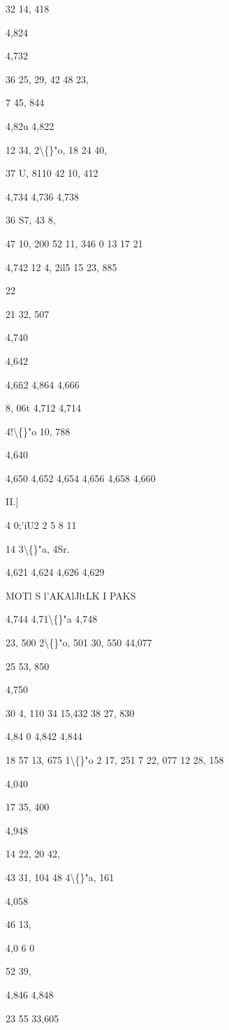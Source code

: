\documentclass[10pt,a4paper]{article}
\begin{document}
32 14, 418

4,824

4,732

36 25,
29,
42
48 23,

7 45, 844

4,82u
4,822

12 34,
2\textbackslash\{\}"o,
18
24 40,

37 U, 8110
42 10, 412

4,734
4,736
4,738

36 S7,
43 8,

47 10, 200
52 11, 346
0
13
17
21

4,742
12 4, 2il5
15 23, 885

22

21 32, 507

4,740

4,642

4,6fi2
4,864
4,666

8, 06t
4,712
4,714

4!\textbackslash\{\}"o 10, 788

4,640

4,650
4,652
4,654
4,656
4,658
4,660

II.]

4 0;'iU2
2
5
8
11

14 3\textbackslash\{\}"a, 4Sr.

4,621
4,624
4,626
4,629

MOTl S l'AKAlJltLK I PAKS

4,744
4,71\textbackslash\{\}"a
4,748

23, 500
2\textbackslash\{\}"o, 501
30, 550
44,077

25 53, 850

4,750

30 4, 110
34 15,432
38 27, 830

4,84 0
4,842
4,844

18 57 13, 675
1\textbackslash\{\}"o 2 17, 251
7 22, 077
12 28, 158

4,040

17 35, 400

4,948

14 22,
20 42,

43 31, 104
48 4\textbackslash\{\}"a, 161

4,058

46 13,

4,0 6 0

52 39,

4,846
4,848

23 55 33,605
\end{document}
